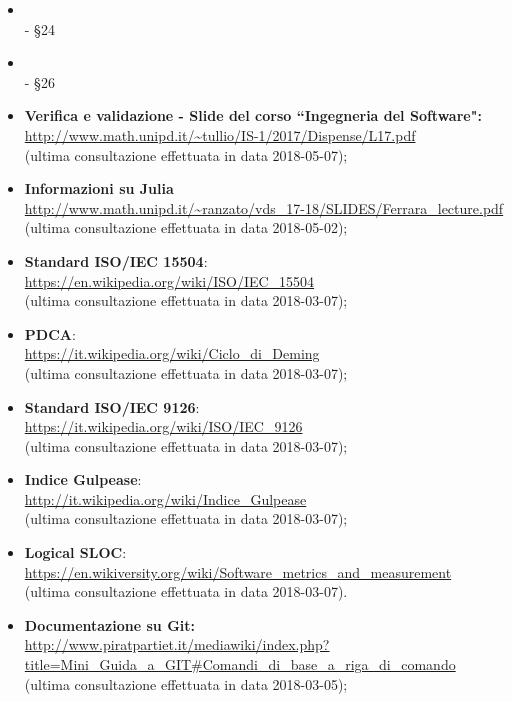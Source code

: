 \begin{itemize}
				\item{}\\
				- \S 24 
		
				\item{}\\
				- \S 26 

				\item\textbf{Verifica e validazione - Slide del corso ``Ingegneria del Software":}\\
				\url{http://www.math.unipd.it/~tullio/IS-1/2017/Dispense/L17.pdf}\\
				(ultima consultazione effettuata in data 2018-05-07);	

                \item
                \textbf{Informazioni su Julia}\\
                \url{http://www.math.unipd.it/~ranzato/vds_17-18/SLIDES/Ferrara_lecture.pdf} \\
                (ultima consultazione effettuata in data 2018-05-02);

				\item \textbf{Standard ISO/IEC 15504}:\\
				\url{https://en.wikipedia.org/wiki/ISO/IEC_15504}\\
				(ultima consultazione effettuata in data 2018-03-07);

				\item \textbf{PDCA}:\\
				\url{https://it.wikipedia.org/wiki/Ciclo_di_Deming}\\
				(ultima consultazione effettuata in data 2018-03-07);

				\item \textbf{Standard ISO/IEC 9126}:\\
				\url{https://it.wikipedia.org/wiki/ISO/IEC_9126}\\
				(ultima consultazione effettuata in data 2018-03-07);

				\item \textbf{Indice Gulpease}:\\
				\url{http://it.wikipedia.org/wiki/Indice_Gulpease}\\
				(ultima consultazione effettuata in data 2018-03-07);

				\item \textbf{Logical SLOC}:\\
				\url{https://en.wikiversity.org/wiki/Software_metrics_and_measurement}\\
				(ultima consultazione effettuata in data 2018-03-07).	
				
				\item
				\textbf{Documentazione su Git:}\\
				\url{http://www.piratpartiet.it/mediawiki/index.php?title=Mini_Guida_a_GIT#Comandi_di_base_a_riga_di_comando} \\
				(ultima consultazione effettuata in data 2018-03-05);
            \end{itemize}
